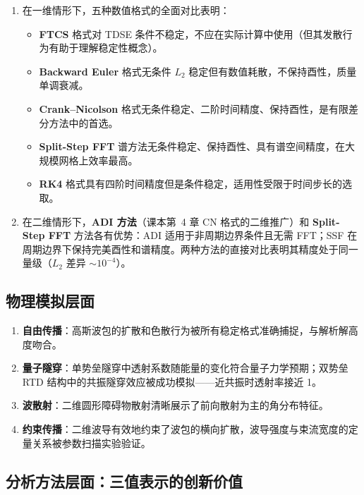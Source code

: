 \documentclass[12pt,a4paper]{article}
\begin{document}
\begin{enumerate}
    \item 在一维情形下，五种数值格式的全面对比表明：
    \begin{itemize}
        \item \textbf{FTCS} 格式对 TDSE 条件不稳定，不应在实际计算中使用（但其发散行为有助于理解稳定性概念）。
        \item \textbf{Backward Euler} 格式无条件 $L_2$ 稳定但有数值耗散，不保持酉性，质量单调衰减。
        \item \textbf{Crank--Nicolson} 格式无条件稳定、二阶时间精度、保持酉性，是有限差分方法中的首选。
        \item \textbf{Split-Step FFT} 谱方法无条件稳定、保持酉性、具有谱空间精度，在大规模网格上效率最高。
        \item \textbf{RK4} 格式具有四阶时间精度但是条件稳定，适用性受限于时间步长的选取。
    \end{itemize}

    \item 在二维情形下，\textbf{ADI 方法}（课本第~4 章 CN 格式的二维推广）和 \textbf{Split-Step FFT} 方法各有优势：ADI 适用于非周期边界条件且无需 FFT；SSF 在周期边界下保持完美酉性和谱精度。两种方法的直接对比表明其精度处于同一量级（$L_2$ 差异 $\sim 10^{-4}$）。
\end{enumerate}

\subsection{物理模拟层面}

\begin{enumerate}
    \item \textbf{自由传播}：高斯波包的扩散和色散行为被所有稳定格式准确捕捉，与解析解高度吻合。
    \item \textbf{量子隧穿}：单势垒隧穿中透射系数随能量的变化符合量子力学预期；双势垒 RTD 结构中的共振隧穿效应被成功模拟——近共振时透射率接近 1。
    \item \textbf{波散射}：二维圆形障碍物散射清晰展示了前向散射为主的角分布特征。
    \item \textbf{约束传播}：二维波导有效地约束了波包的横向扩散，波导强度与束流宽度的定量关系被参数扫描实验验证。
\end{enumerate}

\subsection{分析方法层面：三值表示的创新价值}
\end{document}
